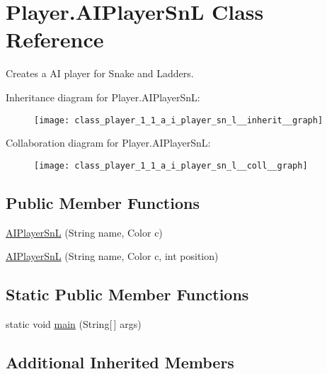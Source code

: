 \hypertarget{class_player_1_1_a_i_player_sn_l}{}\section{Player.\+A\+I\+Player\+Sn\+L Class Reference}
\label{class_player_1_1_a_i_player_sn_l}


Creates a A\+I player for Snake and Ladders.  




Inheritance diagram for Player.\+A\+I\+Player\+Sn\+L\+:
\nopagebreak
\begin{figure}[H]
\begin{center}
\leavevmode
\texttt{[image: class\_player\_1\_1\_a\_i\_player\_sn\_l\_\_inherit\_\_graph]}
\end{center}
\end{figure}


Collaboration diagram for Player.\+A\+I\+Player\+Sn\+L\+:
\nopagebreak
\begin{figure}[H]
\begin{center}
\leavevmode
\texttt{[image: class\_player\_1\_1\_a\_i\_player\_sn\_l\_\_coll\_\_graph]}
\end{center}
\end{figure}
\subsection*{Public Member Functions}
\begin{DoxyCompactItemize}
\item 
\hyperlink{class_player_1_1_a_i_player_sn_l_a6925c3a7d1b9ec60814a81770d013909}{A\+I\+Player\+Sn\+L} (String name, Color c)
\item 
\hyperlink{class_player_1_1_a_i_player_sn_l_af70de8501407cb1a81c609a571155d35}{A\+I\+Player\+Sn\+L} (String name, Color c, int position)
\end{DoxyCompactItemize}
\subsection*{Static Public Member Functions}
\begin{DoxyCompactItemize}
\item 
static void \hyperlink{class_player_1_1_a_i_player_sn_l_addf8c57621626f61e1415d2b945b5eff}{main} (String\mbox{[}$\,$\mbox{]} args)
\end{DoxyCompactItemize}
\subsection*{Additional Inherited Members}


